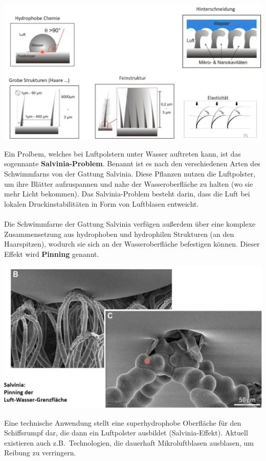 \begin{center}
	\includegraphics[width=14cm]{lec2/figures/prinizpien-luftschichten.png}	
\end{center}
Ein Prolbem, welches bei Luftpolstern unter Wasser auftreten kann, ist das sogennante \textbf{Salvinia-Problem}. Benannt ist es nach den verschiedenen Arten des Schwimmfarns von der Gattung Salvinia. Diese Pflanzen nutzen die Luftpolster, um ihre Blätter aufzuspannen und nahe der Wasseroberfläche zu halten (wo sie mehr Licht bekommen). Das Salvinia-Problem besteht darin, dass die Luft bei lokalen Druckinstabilitäten in Form von Luftblasen entweicht.
\\\\
Die Schwimmfarne der Gattung Salvinia verfügen außerdem über eine komplexe Zusammensetzung aus hydrophoben und hydrophilen Strukturen (an den Haarspitzen), wodurch sie sich an der Wasseroberfläche befestigen können. Dieser Effekt wird \textbf{Pinning} genannt.

\begin{center}
	\includegraphics[width=14cm]{lec2/figures/pinning.png}	
\end{center}
Eine technische Anwendung stellt eine superhydrophobe Oberfläche für den Schiffsrumpf dar, die dann ein Luftpolster ausbildet (Salvinia-Effekt). Aktuell existieren auch z.B.\ Technologien, die dauerhaft Mikroluftblasen ausblasen, um Reibung zu verringern.


